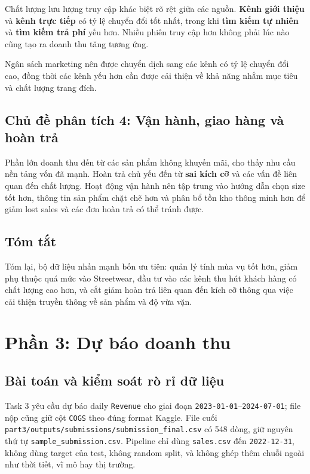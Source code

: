 \documentclass{article}
\begin{document}
Chất lượng lưu lượng truy cập khác biệt rõ rệt giữa các nguồn. \textbf{Kênh giới thiệu} và \textbf{kênh trực tiếp} có tỷ lệ chuyển đổi tốt nhất, trong khi \textbf{tìm kiếm tự nhiên} và \textbf{tìm kiếm trả phí} yếu hơn. Nhiều phiên truy cập hơn không phải lúc nào cũng tạo ra doanh thu tăng tương ứng.

Ngân sách marketing nên được chuyển dịch sang các kênh có tỷ lệ chuyển đổi cao, đồng thời các kênh yếu hơn cần được cải thiện về khả năng nhắm mục tiêu và chất lượng trang đích.

\subsection{Chủ đề phân tích 4: Vận hành, giao hàng và hoàn trả}
Phần lớn doanh thu đến từ các sản phẩm không khuyến mãi, cho thấy nhu cầu nền tảng vốn đã mạnh. Hoàn trả chủ yếu đến từ \textbf{sai kích cỡ} và các vấn đề liên quan đến chất lượng. Hoạt động vận hành nên tập trung vào hướng dẫn chọn size tốt hơn, thông tin sản phẩm chặt chẽ hơn và phân bổ tồn kho thông minh hơn để giảm lost sales và các đơn hoàn trả có thể tránh được.

\subsection{Tóm tắt}
Tóm lại, bộ dữ liệu nhấn mạnh bốn ưu tiên: quản lý tính mùa vụ tốt hơn, giảm phụ thuộc quá mức vào Streetwear, đầu tư vào các kênh thu hút khách hàng có chất lượng cao hơn, và cắt giảm hoàn trả liên quan đến kích cỡ thông qua việc cải thiện truyền thông về sản phẩm và độ vừa vặn.


\section{Phần 3: Dự báo doanh thu}

\subsection{Bài toán và kiểm soát rò rỉ dữ liệu}
Task 3 yêu cầu dự báo daily \texttt{Revenue} cho giai đoạn \texttt{2023-01-01}--\texttt{2024-07-01}; file nộp cũng giữ cột \texttt{COGS} theo đúng format Kaggle. File cuối \texttt{part3/outputs/submissions/submission\_final.csv} có 548 dòng, giữ nguyên thứ tự \texttt{sample\_submission.csv}. Pipeline chỉ dùng \texttt{sales.csv} đến \texttt{2022-12-31}, không dùng target của test, không random split, và không ghép thêm chuỗi ngoài như thời tiết, vĩ mô hay thị trường.
\end{document}
